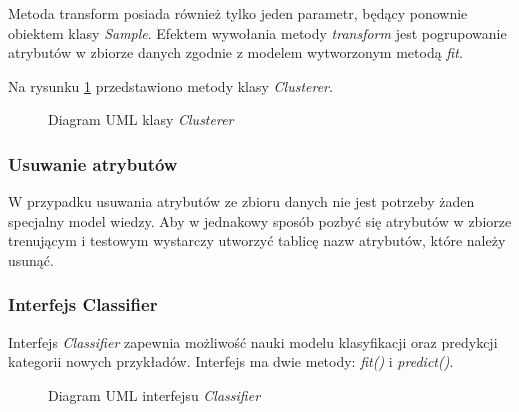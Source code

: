 \documentclass[../thesis.tex]{subfiles}
\begin{document}
Metoda transform posiada również tylko jeden parametr, będący ponownie obiektem klasy \emph{Sample}. Efektem wywołania metody \emph{transform} jest pogrupowanie atrybutów w zbiorze danych zgodnie z modelem wytworzonym metodą \emph{fit}.

Na rysunku \ref{proj:diagram_clusterer} przedstawiono metody klasy \emph{Clusterer}.

\begin{figure}[h]
\centering
{}
\caption{Diagram UML klasy \emph{Clusterer}}
\label{proj:diagram_clusterer}
\end{figure}

\subsubsection{Usuwanie atrybutów}

W przypadku usuwania atrybutów ze zbioru danych nie jest potrzeby żaden specjalny model wiedzy. Aby w jednakowy sposób pozbyć się atrybutów w zbiorze trenującym i testowym wystarczy utworzyć tablicę nazw atrybutów, które należy usunąć.

\subsubsection{Interfejs Classifier}

Interfejs \emph{Classifier} zapewnia możliwość nauki modelu klasyfikacji oraz predykcji kategorii nowych przykładów. Interfejs ma dwie metody: \emph{fit()} i \emph{predict()}.

\begin{figure}[h]
\centering
{}
\caption{Diagram UML interfejsu \emph{Classifier}}
\label{proj:diagram_classifier}
\end{figure}
\end{document}
